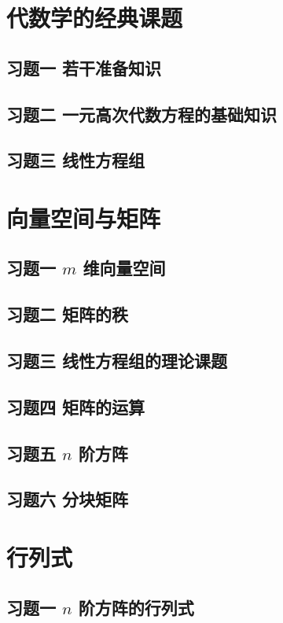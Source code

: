 \documentclass[11pt,a4paper,openany,oneside]{book}
\begin{document}
\chapter{代数学的经典课题}
\section{习题一 \quad 若干准备知识}
\section{习题二 \quad 一元高次代数方程的基础知识}
\section{习题三 \quad 线性方程组}

\chapter{向量空间与矩阵}
\section{习题一 \quad  $ m $  维向量空间}	
\section{习题二 \quad 矩阵的秩}
\section{习题三 \quad 线性方程组的理论课题}
\section{习题四 \quad 矩阵的运算}
\section{习题五 \quad  $ n $  阶方阵}
\section{习题六 \quad 分块矩阵}

\chapter{行列式}
\section{习题一 \quad  $ n $  阶方阵的行列式}
\end{document}
